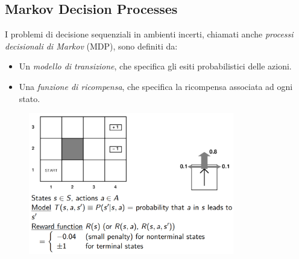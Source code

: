 \documentclass[11pt,oneside]{book}
\begin{document}
\subsection{Markov Decision Processes}
I problemi di decisione sequenziali in ambienti incerti, chiamati anche \textit{processi decisionali di Markov} (MDP), sono definiti da:
\begin{itemize}
    \item Un \textit{modello di transizione}, che specifica gli esiti probabilistici delle azioni.
    \item Una \textit{funzione di ricompensa}, che specifica la ricompensa associata ad ogni stato.
\end{itemize}
\begin{figure}[htp]
	\centering
	\includegraphics[width=0.8\textwidth]{mdp1.png}
\end{figure}
\end{document}
